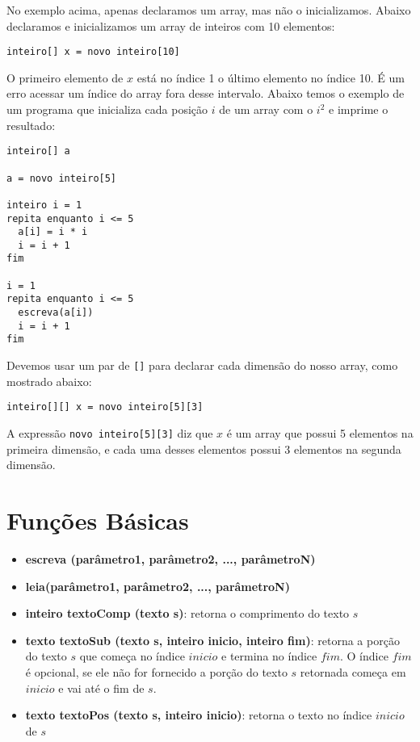 \documentclass{report}
\begin{document}
No exemplo acima, apenas declaramos um array, mas não o
inicializamos. Abaixo declaramos e inicializamos um
array de inteiros com 10 elementos:
\begin{verbatim}
inteiro[] x = novo inteiro[10]
\end{verbatim}

O primeiro elemento de $x$ está no índice 1 o último
elemento no índice 10. É um erro acessar um índice do
array fora desse intervalo. Abaixo temos o exemplo de
um programa que inicializa cada posição $i$ de um array
com o $i^2$ e imprime o resultado:
\begin{verbatim}
inteiro[] a

a = novo inteiro[5]

inteiro i = 1
repita enquanto i <= 5
  a[i] = i * i
  i = i + 1
fim

i = 1
repita enquanto i <= 5
  escreva(a[i])
  i = i + 1
fim
\end{verbatim}


Devemos usar um par de \texttt{[]} para declarar cada dimensão
do nosso array, como mostrado abaixo: 
\begin{verbatim}
inteiro[][] x = novo inteiro[5][3]
\end{verbatim}

A expressão \texttt{novo inteiro[5][3]} diz que $x$ é um
array que possui 5 elementos na primeira dimensão, e cada
uma desses elementos possui 3 elementos na segunda dimensão.


\section{Funções Básicas}

\begin{itemize}
	\item \textbf{escreva (parâmetro1, parâmetro2, ..., parâmetroN)}
	
	\item \textbf{leia(parâmetro1, parâmetro2, ..., parâmetroN)}
	
	\item \textbf{inteiro textoComp (texto s)}: retorna o comprimento do texto $s$
	
	\item \textbf{texto textoSub (texto s, inteiro inicio, inteiro fim)}:
	retorna a porção do texto $s$ que começa no índice $inicio$ e termina
  no índice $fim$. O índice $fim$ é opcional, se ele não for fornecido a
  porção do texto $s$ retornada começa em $inicio$ e vai até o fim de $s$.
	
	\item \textbf{texto textoPos (texto s, inteiro inicio)}:
	retorna o texto no índice $inicio$ de $s$
\end{itemize}
\end{document}
